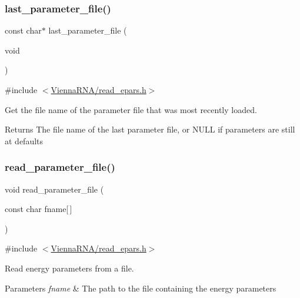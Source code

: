 \subsubsection{\texorpdfstring{last\+\_\+parameter\+\_\+file()}{last\_parameter\_file()}}
{\footnotesize\ttfamily const char$\ast$ last\+\_\+parameter\+\_\+file (\begin{DoxyParamCaption}\item[{void}]{ }\end{DoxyParamCaption})}



{\ttfamily \#include $<$\hyperlink{read__epars_8h}{Vienna\+R\+N\+A/read\+\_\+epars.\+h}$>$}



Get the file name of the parameter file that was most recently loaded. 

\begin{DoxyReturn}{Returns}
The file name of the last parameter file, or N\+U\+LL if parameters are still at defaults 
\end{DoxyReturn}
\mbox{\label{group__energy__parameters__rw_ga165a142a3c68fb6655c69ef4ab7cd749}} 
\subsubsection{\texorpdfstring{read\+\_\+parameter\+\_\+file()}{read\_parameter\_file()}}
{\footnotesize\ttfamily void read\+\_\+parameter\+\_\+file (\begin{DoxyParamCaption}\item[{const char}]{fname\mbox{[}$\,$\mbox{]} }\end{DoxyParamCaption})}



{\ttfamily \#include $<$\hyperlink{read__epars_8h}{Vienna\+R\+N\+A/read\+\_\+epars.\+h}$>$}



Read energy parameters from a file. 


\begin{DoxyParams}{Parameters}
{\em fname} & The path to the file containing the energy parameters \\
\hline
\end{DoxyParams}
\mbox{\label{group__energy__parameters__rw_ga8a43459be386a7489feeab68dc2c6c76}} 
